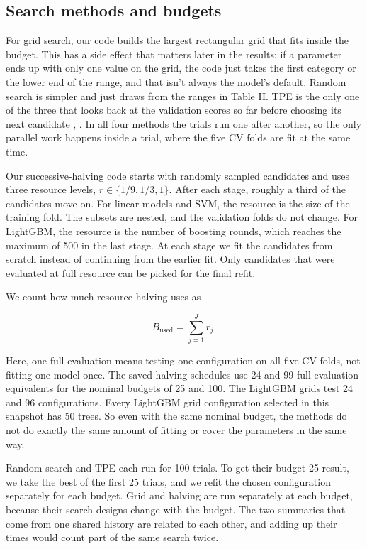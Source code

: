 \documentclass[12pt,letterpaper]{article}
\begin{document}
\subsection{Search methods and budgets}\label{search-methods-and-budgets}

For grid search, our code builds the largest rectangular grid that fits inside the budget. This has a side effect that matters later in the results: if a parameter ends up with only one value on the grid, the code just takes the first category or the lower end of the range, and that isn't always the model's default. Random search is simpler and just draws from the ranges in Table II. TPE is the only one of the three that looks back at the validation scores so far before choosing its next candidate \cite{bergstra11}, \cite{akiba19}. In all four methods the trials run one after another, so the only parallel work happens inside a trial, where the five CV folds are fit at the same time.

Our successive-halving code starts with randomly sampled candidates and uses three resource levels, \(r \in \{1/9, 1/3, 1\}\). After each stage, roughly a third of the candidates move on. For linear models and SVM, the resource is the size of the training fold. The subsets are nested, and the validation folds do not change. For LightGBM, the resource is the number of boosting rounds, which reaches the maximum of 500 in the last stage. At each stage we fit the candidates from scratch instead of continuing from the earlier fit. Only candidates that were evaluated at full resource can be picked for the final refit.

We count how much resource halving uses as

\[B_{\text{used}} = \sum_{j=1}^{J} r_j.\]

Here, one full evaluation means testing one configuration on all five CV folds, not fitting one model once. The saved halving schedules use 24 and 99 full-evaluation equivalents for the nominal budgets of 25 and 100. The LightGBM grids test 24 and 96 configurations. Every LightGBM grid configuration selected in this snapshot has 50 trees. So even with the same nominal budget, the methods do not do exactly the same amount of fitting or cover the parameters in the same way.

Random search and TPE each run for 100 trials. To get their budget-25 result, we take the best of the first 25 trials, and we refit the chosen configuration separately for each budget. Grid and halving are run separately at each budget, because their search designs change with the budget. The two summaries that come from one shared history are related to each other, and adding up their times would count part of the same search twice.
\end{document}
